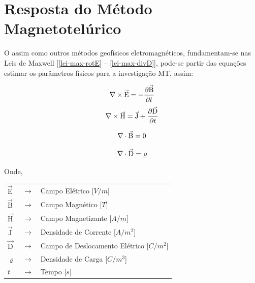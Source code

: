     \section{Resposta do Método Magnetotelúrico}

        O \mt{} assim como outros métodos geofísicos eletromagnéticos, fundamentam-se nas Leis de Maxwell [\ref{lei-max-rotE} -- \ref{lei-max-divD}], pode-se partir das equações estimar os parâmetros físicos para a investigação MT, assim:
        
        \begin{equation}
            \label{lei-max-rotE}
            \nabla \times \vec{\textrm{E}} = - \dfrac{\partial \vec{\textrm{B}}}{\partial t}
        \end{equation}
        \begin{equation}
            \label{lei-max-rotH}
            \nabla \times \vec{\textrm{H}} = \vec{\textrm{J}} + \dfrac{\partial \vec{\textrm{D}}}{\partial t}
        \end{equation}

        \begin{equation}
            \label{lei-max-divB}
            \nabla \cdot \vec{\textrm{B}} = 0 
        \end{equation}

        \begin{equation}
            \label{lei-max-divD}
            \nabla \cdot \vec{\textrm{D}} = \varrho                
        \end{equation}
        
        \noindent Onde,
            
        {\footnotesize \noindent
            \begin{table}[H]
                \begin{tabular*}{1cm}{p{0.05cm}p{0.1cm}p{10cm}}
                    {\footnotesize $\vec{\textrm{E}}$}  & {\footnotesize $\rightarrow$} & {\footnotesize Campo Elétrico [$V/m$] }\\
                    {\footnotesize $\vec{\textrm{B}}$}  & {\footnotesize $\rightarrow$} & {\footnotesize Campo Magnético [$T$] }\\
                    {\footnotesize $\vec{\textrm{H}}$}  & {\footnotesize $\rightarrow$} & {\footnotesize Campo Magnetizante [$A/m$]} \\
                    {\footnotesize $\vec{\textrm{J}}$}  & {\footnotesize $\rightarrow$} & {\footnotesize Densidade de Corrente [$A/m^2$]} \\
                    {\footnotesize $\vec{\textrm{D}}$}  & {\footnotesize $\rightarrow$} & {\footnotesize Campo de Deslocamento Elétrico [$C/m^2$]} \\
                    {\footnotesize $\varrho$}           & {\footnotesize $\rightarrow$} & {\footnotesize Densidade de Carga [$C/m^3$]} \\
                    {\footnotesize $t$ }                & {\footnotesize $\rightarrow$} & {\footnotesize Tempo [$s$]}
                \end{tabular*}
            \end{table}}


